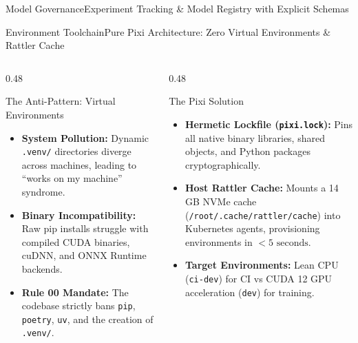 \begin{frame}{Model Governance}{Experiment Tracking \& Model Registry with Explicit Schemas}
\end{frame}

\begin{frame}{Environment Toolchain}{Pure Pixi Architecture: Zero Virtual Environments \& Rattler Cache}
    \begin{columns}[T]
        \begin{column}{0.48\textwidth}
            \begin{block}{The Anti-Pattern: Virtual Environments}
                \begin{itemize}\footnotesize
                    \item \textbf{System Pollution:} Dynamic \texttt{.venv/} directories diverge across machines, leading to ``works on my machine'' syndrome.
                    \item \textbf{Binary Incompatibility:} Raw pip installs struggle with compiled CUDA binaries, cuDNN, and ONNX Runtime backends.
                    \item \textbf{Rule 00 Mandate:} The codebase strictly bans \texttt{pip}, \texttt{poetry}, \texttt{uv}, and the creation of \texttt{.venv/}.
                \end{itemize}
            \end{block}
        \end{column}
        \begin{column}{0.48\textwidth}
            \begin{block}{The Pixi Solution}
                \begin{itemize}\footnotesize
                    \item \textbf{Hermetic Lockfile (\texttt{pixi.lock}):} Pins all native binary libraries, shared objects, and Python packages cryptographically.
                    \item \textbf{Host Rattler Cache:} Mounts a 14 GB NVMe cache (\texttt{/root/.cache/rattler/cache}) into Kubernetes agents, provisioning environments in $< 5\text{ seconds}$.
                    \item \textbf{Target Environments:} Lean CPU (\texttt{ci-dev}) for CI vs CUDA 12 GPU acceleration (\texttt{dev}) for training.
                \end{itemize}
            \end{block}
        \end{column}
    \end{columns}


\end{frame}
